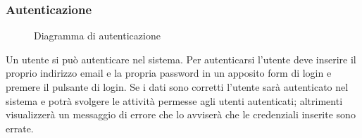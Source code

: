 \documentclass[a4paper, titlepage]{article}
\begin{document}
\subsubsection{Autenticazione}
\begin{figure}[H]
	\centering
	\noindent{}
	\caption{Diagramma di autenticazione}
\end{figure}
Un utente si può autenticare nel sistema. Per autenticarsi l'utente deve inserire il proprio indirizzo email e la propria password in un apposito form di login e premere il pulsante di login. Se i dati sono corretti l'utente sarà autenticato nel sistema e potrà svolgere le attività permesse agli utenti autenticati; altrimenti visualizzerà un messaggio di errore che lo avviserà che le credenziali inserite sono errate. 

\newpage
\end{document}
